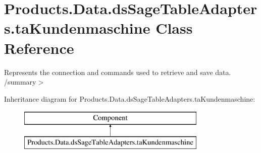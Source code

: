 \hypertarget{class_products_1_1_data_1_1ds_sage_table_adapters_1_1ta_kundenmaschine}{}\section{Products.\+Data.\+ds\+Sage\+Table\+Adapters.\+ta\+Kundenmaschine Class Reference}
\label{class_products_1_1_data_1_1ds_sage_table_adapters_1_1ta_kundenmaschine}


Represents the connection and commands used to retrieve and save data. /summary$>$  


Inheritance diagram for Products.\+Data.\+ds\+Sage\+Table\+Adapters.\+ta\+Kundenmaschine\+:\begin{figure}[H]
\begin{center}
\leavevmode
\includegraphics[height=2.000000cm]{class_products_1_1_data_1_1ds_sage_table_adapters_1_1ta_kundenmaschine}
\end{center}
\end{figure}
